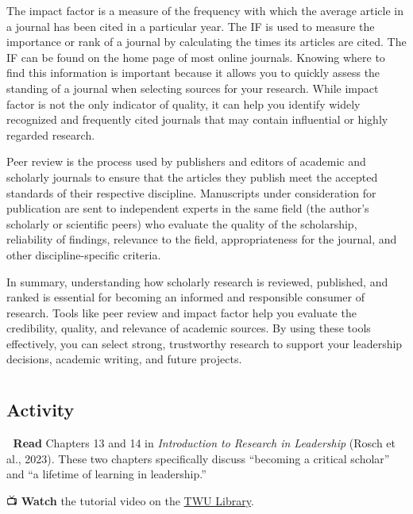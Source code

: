 \documentclass[
  letterpaper,
  DIV=11,
  numbers=noendperiod]{scrreprt}
\begin{document}
The impact factor is a measure of the frequency with which the average
article in a journal has been cited in a particular year. The IF is used
to measure the importance or rank of a journal by calculating the times
its articles are cited. The IF can be found on the home page of most
online journals. Knowing where to find this information is important
because it allows you to quickly assess the standing of a journal when
selecting sources for your research. While impact factor is not the only
indicator of quality, it can help you identify widely recognized and
frequently cited journals that may contain influential or highly
regarded research.

Peer review is the process used by publishers and editors of academic
and scholarly journals to ensure that the articles they publish meet the
accepted standards of their respective discipline. Manuscripts under
consideration for publication are sent to independent experts in the
same field (the author's scholarly or scientific peers) who evaluate the
quality of the scholarship, reliability of findings, relevance to the
field, appropriateness for the journal, and other discipline-specific
criteria.

In summary, understanding how scholarly research is reviewed, published,
and ranked is essential for becoming an informed and responsible
consumer of research. Tools like peer review and impact factor help you
evaluate the credibility, quality, and relevance of academic sources. By
using these tools effectively, you can select strong, trustworthy
research to support your leadership decisions, academic writing, and
future projects.

\section*{}\label{section-5}

\markright{}

\subsection*{Activity}\label{activity}

📖 \textbf{Read} Chapters 13 and 14 in \emph{Introduction to Research in
Leadership} (Rosch et al., 2023). These two chapters specifically
discuss ``becoming a critical scholar'' and ``a lifetime of learning in
leadership.''

📺 \textbf{Watch} the tutorial video on the
\href{https://www.twu.ca/academics/library}{TWU Library}.
\end{document}
